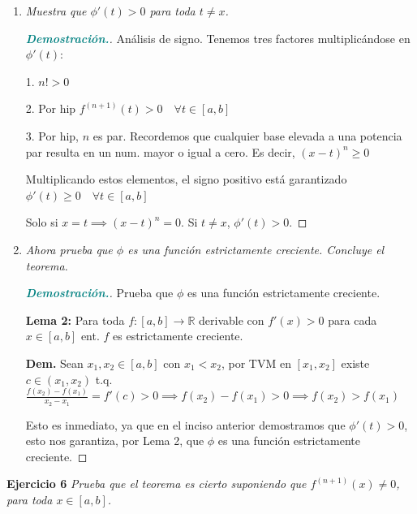 \documentclass[12pt, letterpaper]{article}
\begin{document}
\begin{enumerate}[label=(\alph*)]
    \item \textit{Muestra que $\phi'(t) > 0$ para toda $t \neq x$.}
    
    \begin{proof}[\textbf{\textcolor{teal}{Demostración.}}]
        Análisis de signo. Tenemos tres factores multiplicándose en $\phi'(t)$:
        
        1. $n! > 0$
        
        2. Por hip $f^{(n+1)}(t) > 0 \quad \forall t \in [a,b]$
        
        3. Por hip, $n$ es par. Recordemos que cualquier base elevada a una potencia par resulta en un num. mayor o igual a cero. Es decir, $(x-t)^n \geq 0$
        
        Multiplicando estos elementos, el signo positivo está garantizado $\phi'(t) \geq 0 \quad \forall t \in [a,b]$
        
        Solo si $x=t \implies (x-t)^n=0$. Si $t \neq x$, $\phi'(t)>0$.
    \end{proof}

    \item \textit{Ahora prueba que $\phi$ es una función estrictamente creciente. Concluye el teorema.}
    
    \begin{proof}[\textbf{\textcolor{teal}{Demostración.}}]
        Prueba que $\phi$ es una función estrictamente creciente.
        
        \textbf{\textcolor{burdeos}{Lema 2:}} Para toda $f:[a,b] \to \mathbb{R}$ derivable con $f'(x)>0$ para cada $x \in [a,b]$ ent. $f$ es estrictamente creciente.
        
        \textbf{\textcolor{burdeos}{Dem.}} Sean $x_1, x_2 \in [a,b]$ con $x_1 < x_2$, por TVM en $[x_1, x_2]$ existe $c \in (x_1, x_2)$ t.q. $\frac{f(x_2)-f(x_1)}{x_2-x_1} = f'(c) > 0 \implies f(x_2)-f(x_1)>0 \implies f(x_2)>f(x_1)$
        
        Esto es inmediato, ya que en el inciso anterior demostramos que $\phi'(t)>0$, esto nos garantiza, por Lema 2, que $\phi$ es una función estrictamente creciente.
    \end{proof}
\end{enumerate}

\vspace{0.4cm}
\noindent \textbf{Ejercicio 6} \textit{Prueba que el teorema es cierto suponiendo que $f^{(n+1)}(x) \neq 0$, para toda $x \in [a,b]$.}
\end{document}
